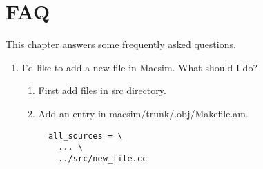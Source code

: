 

\chapter{FAQ}
\label{sec:faq}

This chapter answers some frequently asked questions.

\begin{enumerate}[Q 1.]
  \item I'd like to add a new file in Macsim. What should I do? 

\begin{enumerate}[1.]
\item First add files in src directory.
\item Add an entry in macsim/trunk/.obj/Makefile.am.
\begin{Verbatim}
  all_sources = \
    ... \
    ../src/new_file.cc
\end{Verbatim}
\end{enumerate}

\end{enumerate}
